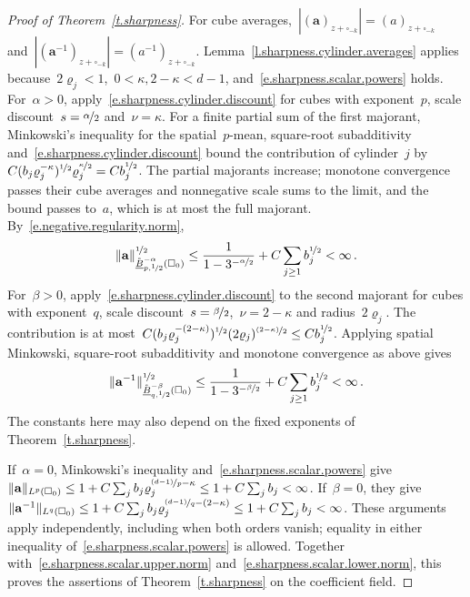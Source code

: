 \documentclass[11pt,letterpaper]{article}
\numberwithin{equation}{section}
\theoremstyle{definition}
\renewcommand{\a}{\mathbf{a}}
\newcommand{\nf}{\nicefrac}
\newcommand{\cu}{\square}
\DeclarePairedDelimiter{\norm}{\lVert}{\rVert}
\begin{document}
\begin{proof}[Proof of Theorem~\ref{t.sharpness}]
\smallskip
For cube averages,~$|(\a)_{z+\cu_{-k}}|=(a)_{z+\cu_{-k}}$ and~$|(\a^{-1})_{z+\cu_{-k}}|=(a^{-1})_{z+\cu_{-k}}$. Lemma~\ref{l.sharpness.cylinder.averages} applies because~$2\varrho_j<1$,~$0<\kappa,2-\kappa<d-1$, and~\eqref{e.sharpness.scalar.powers} holds. For~$\alpha>0$, apply~\eqref{e.sharpness.cylinder.discount} for cubes with exponent~$p$, scale discount~$s=\nf\alpha2$ and~$\nu=\kappa$. For a finite partial sum of the first majorant, Minkowski's inequality for the spatial~$p$-mean, square-root subadditivity and~\eqref{e.sharpness.cylinder.discount} bound the contribution of cylinder~$j$ by~$C(b_j\varrho_j^{-\kappa})^{\nf12}\varrho_j^{\nf\kappa2}=Cb_j^{\nf12}$. The partial majorants increase; monotone convergence passes their cube averages and nonnegative scale sums to the limit, and the bound passes to~$a$, which is at most the full majorant. By~\eqref{e.negative.regularity.norm},
\begin{equation}
	\norm{\a}_{\mathring{\underline B}^{-\alpha}_{p,\nf12}(\cu_0)}^{\nf12}\leq\frac1{1-3^{-\nf\alpha2}}+C\sum_{j\geq1}b_j^{\nf12}<\infty\,.
	\label{e.sharpness.scalar.upper.norm}
\end{equation}
For~$\beta>0$, apply~\eqref{e.sharpness.cylinder.discount} to the second majorant for cubes with exponent~$q$, scale discount~$s=\nf\beta2$,~$\nu=2-\kappa$ and radius~$2\varrho_j$. The contribution is at most~$C(b_j\varrho_j^{-(2-\kappa)})^{\nf12}(2\varrho_j)^{\nf{(2-\kappa)}2}\leq Cb_j^{\nf12}$. Applying spatial Minkowski, square-root subadditivity and monotone convergence as above gives
\begin{equation}
	\norm{\a^{-1}}_{\mathring{\underline B}^{-\beta}_{q,\nf12}(\cu_0)}^{\nf12}\leq\frac1{1-3^{-\nf\beta2}}+C\sum_{j\geq1}b_j^{\nf12}<\infty\,.
	\label{e.sharpness.scalar.lower.norm}
\end{equation}
The constants here may also depend on the fixed exponents of Theorem~\ref{t.sharpness}.

\smallskip
If~$\alpha=0$, Minkowski's inequality and~\eqref{e.sharpness.scalar.powers} give~$\norm{\a}_{L^p(\cu_0)}\leq1+C\sum_jb_j\varrho_j^{\nf{(d-1)}p-\kappa}\leq1+C\sum_jb_j<\infty$. If~$\beta=0$, they give~$\norm{\a^{-1}}_{L^q(\cu_0)}\leq1+C\sum_jb_j\varrho_j^{\nf{(d-1)}q-(2-\kappa)}\leq1+C\sum_jb_j<\infty$. These arguments apply independently, including when both orders vanish; equality in either inequality of~\eqref{e.sharpness.scalar.powers} is allowed. Together with~\eqref{e.sharpness.scalar.upper.norm} and~\eqref{e.sharpness.scalar.lower.norm}, this proves the assertions of Theorem~\ref{t.sharpness} on the coefficient field.


\end{proof}
\end{document}
